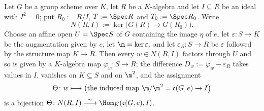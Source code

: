 \begin{lemma}
\label{lem:av-kernel-cotangent}
Let $G$ be a group scheme over $K$, let $R$ be a $K$-algebra and let
$I\subseteq R$ be an ideal with $I^2=0$; put $R_0:=R/I$, $T:=\Spec R$ and
$T_0:=\Spec R_0$.  Write
\[
  N(R,I):=\ker\bigl(G(R)\longrightarrow G(R_0)\bigr).
\]
Choose an affine open $U=\Spec S$ of $G$ containing the image $\eta$ of $e$,
let $\varepsilon\colon S\to K$ be the augmentation given by $e$, let
$\m=\ker\varepsilon$, and let $\varepsilon_R\colon S\to R$ be $\varepsilon$
followed by the structure map $K\to R$.  Then every $w\in N(R,I)$ factors
through $U$ and so is given by a $K$-algebra map $\varphi_w\colon S\to R$; the
difference $D_w:=\varphi_w-\varepsilon_R$ takes values in $I$, vanishes on
$K\subseteq S$ and on $\m^2$, and the assignment
\[
  \Theta\colon w\longmapsto\bigl(\text{the induced map }
  \m/\m^2=\mathfrak c(G,e)\to I\bigr)
\]
is a bijection
$\Theta\colon N(R,I)\xrightarrow{\ \sim\ }\Hom_K(\mathfrak c(G,e),I)$.
\end{lemma}

